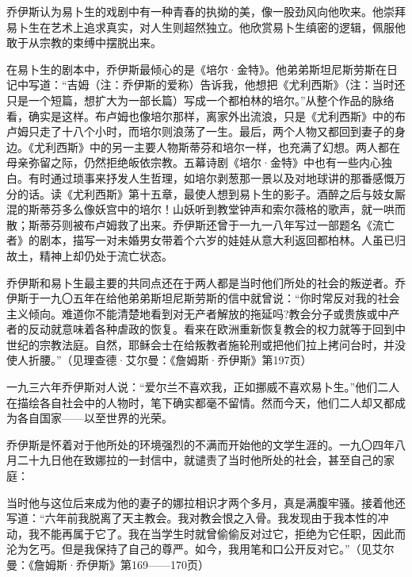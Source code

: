 \par 乔伊斯认为易卜生的戏剧中有一种青春的执拗的美，像一股劲风向他吹来。他崇拜易卜生在艺术上追求真实，对人生则超然独立。他欣赏易卜生缜密的逻辑，佩服他敢于从宗教的束缚中摆脱出来。
\par 在易卜生的剧本中，乔伊斯最倾心的是《培尔·金特》。他弟弟斯坦尼斯劳斯在日记中写道：“吉姆（注：乔伊斯的爱称）告诉我，他想把《尤利西斯》（注：当时还只是一个短篇，想扩大为一部长篇）写成一个都柏林的培尔。”从整个作品的脉络看，确实是这样。布卢姆也像培尔那样，离家外出流浪，只是《尤利西斯》中的布卢姆只走了十八个小时，而培尔则浪荡了一生。最后，两个人物又都回到妻子的身边。《尤利西斯》中的另一主要人物斯蒂芬和培尔一样，也充满了幻想。两人都在母亲弥留之际，仍然拒绝皈依宗教。五幕诗剧《培尔·金特》中也有一些内心独白。有时通过琐事来抒发人生哲理，如培尔剥葱那一景以及对地球讲的那番感慨万分的话。读《尤利西斯》第十五章，最使人想到易卜生的影子。酒醉之后与妓女厮混的斯蒂芬多么像妖宫中的培尔！山妖听到教堂钟声和索尔薇格的歌声，就一哄而散；斯蒂芬则被布卢姆救了出来。乔伊斯还曾于一九一八年写过一部题名《流亡者》的剧本，描写一对未婚男女带着个六岁的娃娃从意大利返回都柏林。人虽已归故土，精神上却仍处于流亡状态。
\par 乔伊斯和易卜生最主要的共同点还在于两人都是当时他们所处的社会的叛逆者。乔伊斯于一九〇五年在给他弟弟斯坦尼斯劳斯的信中就曾说：“你时常反对我的社会主义倾向。难道你不能清楚地看到对无产者解放的拖延吗?教会分子或贵族或中产者的反动就意味着各种虐政的恢复。看来在欧洲重新恢复教会的权力就等于回到中世纪的宗教法庭。自然，耶稣会士在给叛教者施轮刑或把他们拉上拷问台时，并没使人折腰。”（见理查德·艾尔曼：《詹姆斯·乔伊斯》第197页）
\par 一九三六年乔伊斯对人说：“爱尔兰不喜欢我，正如挪威不喜欢易卜生。”他们二人在描绘各自社会中的人物时，笔下确实都毫不留情。然而今天，他们二人却又都成为各自国家——以至世界的光荣。
\par 乔伊斯是怀着对于他所处的环境强烈的不满而开始他的文学生涯的。一九〇四年八月二十九日他在致娜拉的一封信中，就谴责了当时他所处的社会，甚至自己的家庭：
\par 当时他与这位后来成为他的妻子的娜拉相识才两个多月，真是满腹牢骚。接着他还写道：“六年前我脱离了天主教会。我对教会恨之入骨。我发现由于我本性的冲动，我不能再属于它了。我在当学生时就曾偷偷反对过它，拒绝为它任职，因此而沦为乞丐。但是我保持了自己的尊严。如今，我用笔和口公开反对它。”（见艾尔曼：《詹姆斯·乔伊斯》第169——170页）
